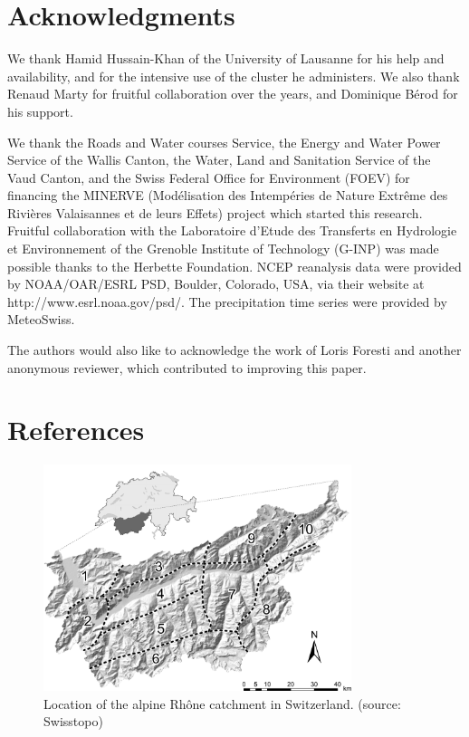 \documentclass[review]{elsarticle}
\begin{document}
\section*{Acknowledgments}
We thank Hamid Hussain-Khan of the University of Lausanne for his help and availability, and for the intensive use of the cluster he administers. We also thank Renaud Marty for fruitful collaboration over the years, and Dominique B\'{e}rod for his support.

We thank the Roads and Water courses Service, the Energy and Water Power Service of the Wallis Canton, the Water, Land and Sanitation Service of the Vaud Canton, and the Swiss Federal Office for Environment (FOEV) for financing the MINERVE (Mod\'{e}lisation des Intemp\'{e}ries de Nature Extr\^{e}me des Rivi\`{e}res Valaisannes et de leurs Effets) project which started this research. Fruitful collaboration with the Laboratoire d'Etude des Transferts en Hydrologie et Environnement of the Grenoble Institute of Technology (G-INP) was made possible thanks to the Herbette Foundation. NCEP reanalysis data were provided by NOAA/OAR/ESRL PSD, Boulder, Colorado, USA, via their website at http://www.esrl.noaa.gov/psd/. The precipitation time series were provided by MeteoSwiss. 

The authors would also like to acknowledge the work of Loris Foresti and another anonymous reviewer, which contributed to improving this paper. 

\section*{References}



\clearpage


\begin{figure}[t]
	\centerline{\includegraphics[width=9cm]{figures/fig01.pdf}}
	\caption{Location of the alpine Rh\^{o}ne catchment in Switzerland. (source: Swisstopo)}
	\label{fig:map}
\end{figure}
\end{document}
